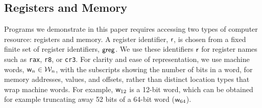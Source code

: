 \subsection{Registers and Memory}
Programs we demonstrate in this paper requires accessing two types of computer resource: registers and memory.
A register identifier, $\mathsf{r}$, is chosen from a fixed finite set of register identifiers, $\mathsf{greg}$. 
We use these identifiers $\mathsf{r}$ for register names such as \texttt{rax}, \texttt{r8}, or \texttt{cr3}.
For clarity and ease of representation, we use machine words, $\mathsf{w}_n \in \mathcal{W}_n$, with the subscripts showing the number of bits in a word,
for memory addresses, values, and offsets, rather than distinct location types that wrap machine words.
For example, $\mathsf{w}_{12}$ is a 12-bit word, which can be obtained for example truncating away 52 bits of a 64-bit word ($\mathsf{w}_{64}$).
